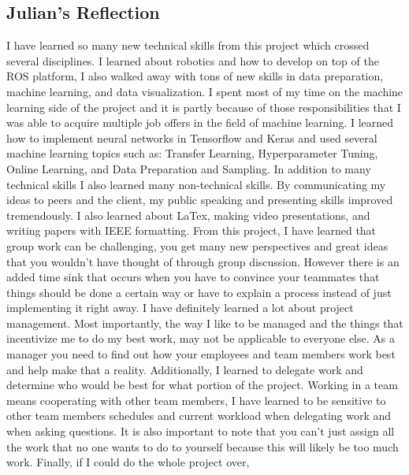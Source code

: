 \documentclass[draftclsnofoot, onecolumn, 10pt, compsoc]{IEEEtran}
\begin{document}
  \subsection{Julian's Reflection}
  I have learned so many new technical skills from this project which crossed several disciplines. I learned about robotics and how to develop on top of the ROS platform, I also walked away with tons of new skills in data preparation, machine learning, and data visualization. I spent most of my time on the machine learning side of the project and it is partly because of those responsibilities that I was able to acquire multiple job offers in the field of machine learning. I learned how to implement neural networks in Tensorflow and Keras and used several machine learning topics such as: Transfer Learning, Hyperparameter Tuning, Online Learning, and Data Preparation and Sampling. 
	In addition to many technical skills I also learned many non-technical skills. By communicating my ideas to peers and the client, my public speaking and presenting skills improved tremendously. I also learned about LaTex, making video presentations, and writing papers with IEEE formatting. From this project, I have learned that group work can be challenging, you get many new perspectives and great ideas that you wouldn't have thought of through group discussion. However there is an added time sink that occurs when you have to convince your teammates that things should be done a certain way or have to explain a process instead of just implementing it right away.
    I have definitely learned a lot about project management. Most importantly, the way I like to be managed and the things that incentivize me to do my best work, may not be applicable to everyone else. As a manager you need to find out how your employees and team members work best and help make that a reality. Additionally, I learned to delegate work and determine who would be best for what portion of the project. Working in a team means cooperating with other team members, I have learned to be sensitive to other team members schedules and current workload when delegating work and when asking questions. It is also important to note that you can't just assign all the work that no one wants to do to yourself because this will likely be too much work.
    Finally, if I could do the whole project over,
\end{document}
